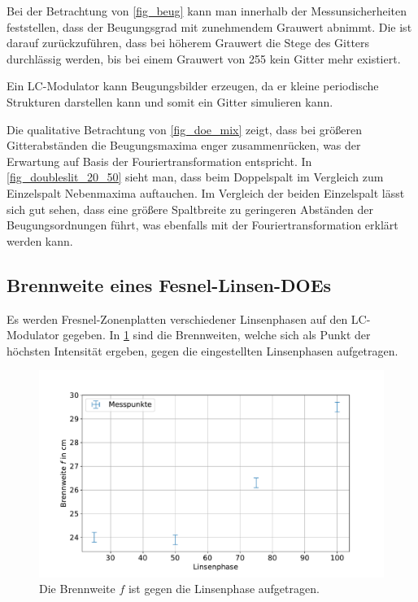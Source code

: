 \documentclass[
	a4paper,
	12pt,
	pagesize,
	ngerman
]{scrartcl}
\begin{document}
			Bei der Betrachtung von \cref{fig_beug} kann man innerhalb der Messunsicherheiten feststellen, dass der Beugungsgrad mit zunehmendem Grauwert abnimmt.
			Die ist darauf zurückzuführen, dass bei höherem Grauwert die Stege des Gitters durchlässig werden, bis bei einem Grauwert von \SI{255}{} kein Gitter mehr existiert.

			Ein LC-Modulator kann Beugungsbilder erzeugen, da er kleine periodische Strukturen darstellen kann und somit ein Gitter simulieren kann. %

			Die qualitative Betrachtung von \cref{fig_doe_mix} zeigt, dass bei größeren Gitterabständen die Beugungsmaxima enger zusammenrücken, was der Erwartung auf Basis der Fouriertransformation entspricht.
			In \cref{fig_doubleslit_20_50} sieht man, dass beim Doppelspalt im Vergleich zum Einzelspalt Nebenmaxima auftauchen.
			Im Vergleich der beiden Einzelspalt lässt sich gut sehen, dass eine größere Spaltbreite zu geringeren Abständen der Beugungsordnungen führt, was ebenfalls mit der Fouriertransformation erklärt werden kann.

		\subsection{Brennweite eines Fesnel-Linsen-DOEs}
		Es werden Fresnel-Zonenplatten verschiedener Linsenphasen auf den LC-Modulator gegeben.
		In \cref{fig_fresnel} sind die Brennweiten, welche sich als Punkt der höchsten Intensität ergeben, gegen die eingestellten Linsenphasen aufgetragen.

\begin{figure}[H] %
			\includegraphics[width=0.8\linewidth]{img/fresnel}
			\caption{
			Die Brennweite $f$ ist gegen die Linsenphase aufgetragen.
			}
			\label{fig_fresnel}
	\end{figure}
\end{document}
